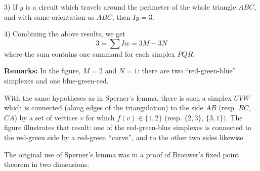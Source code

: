 \documentclass[12pt]{article}
\begin{document}
3) If $y$ is a circuit which travels around the perimeter of the whole
triangle $ABC$, and with same orientation as $ABC$, then $Iy=3$.

4) Combining the above results, we get
$$3=\sum Iw=3M - 3N$$
where the sum contains one summand for each simplex $PQR$.

\noindent
\textbf{Remarks: }
In the figure, $M=2$ and $N=1$: there are two ``red-green-blue'' simplexes and one blue-green-red. 

With the same hypotheses as in Sperner's lemma, there is such a simplex $UVW$
which is connected (along edges of the triangulation) to
the side $AB$ (resp. $BC$,$CA$)
by a set of vertices $v$ for which $f(v)\in\{1,2\}$ (resp. $\{2,3\}$,
$\{3,1\})$. The figure illustrates that result: one of the red-green-blue
simplexes is connected to the red-green side by a red-green ``curve'',
and to the other two sides likewise.

The original use of Sperner's lemma was in a proof
of Brouwer's fixed point theorem in two dimensions.
\end{document}
